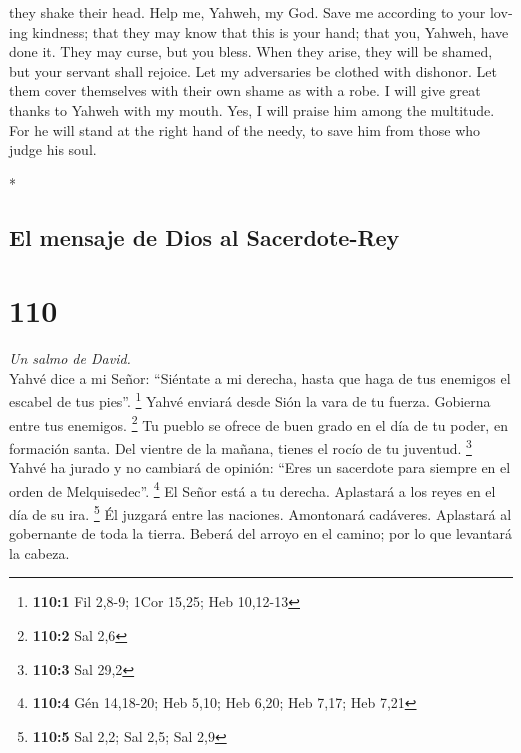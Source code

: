 \begin{paracol}{2}
\begin{otherlanguage}{english}
they shake their head.  Help me, Yahweh, my God. Save me
according to your loving kindness;  that they may know
that this is your hand; that you, Yahweh, have done it. 
They may curse, but you bless. When they arise, they will be shamed, but
your servant shall rejoice.  Let my adversaries be
clothed with dishonor. Let them cover themselves with their own shame as
with a robe.  I will give great thanks to Yahweh with my
mouth. Yes, I will praise him among the multitude.  For
he will stand at the right hand of the needy, to save him from those who
judge his soul.

\end{otherlanguage}

\switchcolumn[0]*

\hypertarget{el-mensaje-de-dios-al-sacerdote-rey}{%
\subsection{El mensaje de Dios al
Sacerdote-Rey}\label{el-mensaje-de-dios-al-sacerdote-rey}}

\hypertarget{section-218}{%
\section{110}\label{section-218}}

\emph{Un salmo de David.}\\
 Yahvé dice a mi Señor: ``Siéntate a mi derecha, hasta que
haga de tus enemigos el escabel de tus pies''. \footnote{\textbf{110:1}
  Fil 2,8-9; 1Cor 15,25; Heb 10,12-13}  Yahvé enviará
desde Sión la vara de tu fuerza. Gobierna entre tus enemigos.
\footnote{\textbf{110:2} Sal 2,6}  Tu pueblo se ofrece de
buen grado en el día de tu poder, en formación santa. Del vientre de la
mañana, tienes el rocío de tu juventud. \footnote{\textbf{110:3} Sal
  29,2}  Yahvé ha jurado y no cambiará de opinión: ``Eres
un sacerdote para siempre en el orden de Melquisedec''. \footnote{\textbf{110:4}
  Gén 14,18-20; Heb 5,10; Heb 6,20; Heb 7,17; Heb 7,21} 
El Señor está a tu derecha. Aplastará a los reyes en el día de su ira.
\footnote{\textbf{110:5} Sal 2,2; Sal 2,5; Sal 2,9}  Él
juzgará entre las naciones. Amontonará cadáveres. Aplastará al
gobernante de toda la tierra.  Beberá del arroyo en el
camino; por lo que levantará la cabeza.


\end{paracol}
